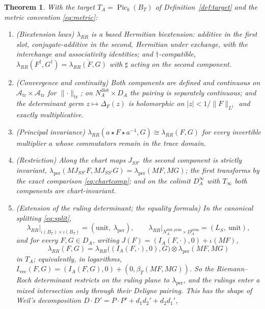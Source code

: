 \documentclass[11pt]{amsart}
\newtheorem{theorem}{Theorem}[section]
\theoremstyle{definition}
\theoremstyle{remark}
\newcommand{\Picb}{\operatorname{Pic}_{b}}
\newcommand{\DA}{D_A}
\newcommand{\Atr}{\mathcal A_{\mathrm{tr}}}
\newcommand{\BT}{B_T}
\newcommand{\NAd}{N_A^{\mathrm{dist}}}
\begin{document}
\begin{theorem}\label{thm:RR}
With the target $T_A=\Picb(\BT)$ of Definition~\ref{def:target} and the metric
convention \eqref{eq:metric}:
\begin{enumerate}
\item[(a)] \emph{(Biextension laws)}  $\lambda_{RR}$ is a based Hermitian
biextension: additive in the first slot, conjugate-additive in the second,
Hermitian under exchange, with the interchange and associativity identities;
and $\dagger$-compatible,
$\lambda_{RR}(F^{\dagger},G^{\dagger})=\overline{\lambda_{RR}(F,G)}$ with
$\sharp$ acting on the second component.
\item[(b)] \emph{(Convergence and continuity)}  Both components are defined and
continuous on $\Atr\times\Atr$ for $\lVert\cdot\rVert_{\mathrm{tr}}$; on
$\NAd\times\DA$ the pairing is separately continuous; and the determinant germ
$z\mapsto\Delta_F(z)$ is holomorphic on $|z|<1/\lVert F\rVert_{L^{1}}$ and
exactly multiplicative.
\item[(c)] \emph{(Principal invariance)}
$\lambda_{RR}(a\star F\star a^{-1},G)\cong\lambda_{RR}(F,G)$ for every
invertible multiplier $a$ whose commutators remain in the trace domain.
\item[(d)] \emph{(Restriction)}  Along the chart maps $J_{SS'}$ the second
component is strictly invariant,
$\lambda_{\mathrm{per}}(MJ_{SS'}F,MJ_{SS'}G)=\lambda_{\mathrm{per}}(MF,MG)$; the
first transforms by the exact comparison \eqref{eq:chartcomp}; and on the
colimit $\DA^{\infty}$ with $T_{\infty}$ both components are chart-invariant.
\item[(e)] \emph{(Extension of the ruling determinant; the equality formula)}
In the canonical splitting \eqref{eq:split},
\[
\lambda_{RR}\bigl|_{\iota(\BT)\times \iota(\BT)}=(\mathrm{unit},\ 
\lambda_{\mathrm{per}}),\qquad
\lambda_{RR}\bigl|_{N_A^{\mathrm{dist,prim}}\times\DA^{\mathrm{prim}}}
=(L_S,\ \mathrm{unit}),
\]
and for every $F,G\in\DA$, writing $J(F)=(I_A(F,\cdot),0)+\iota(MF)$,
\begin{equation}\label{eq:weilformula}
\lambda_{RR}(F,G)=\lambda_{RR}\bigl((I_A(F,\cdot),0),G\bigr)\otimes
\lambda_{\mathrm{per}}(MF,MG)
\end{equation}
in $T_A$; equivalently, in logarithms,
$I_{\mathrm{vec}}(F,G)=(I_A(F,G),0)+(0,\beta_T(MF,MG))$.  So the Riemann--Roch
determinant restricts on the ruling plane to $\lambda_{\mathrm{per}}$, and the
rulings enter a mixed intersection only through their Deligne pairing.  This
has the shape of Weil's decomposition $D\cdot D'=P\cdot P'+d_1d_2'+d_2d_1'$,

\end{enumerate}
\end{theorem}
\end{document}
